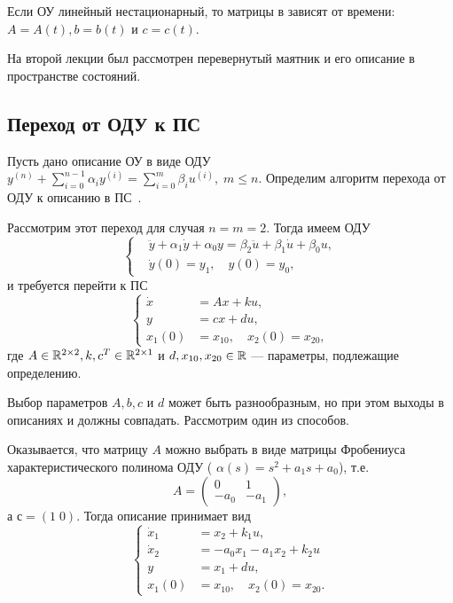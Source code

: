 \documentclass[../../TAU.tex]{subfiles}
\begin{document}
    Если ОУ линейный нестационарный, то матрицы в  зависят от времени: $A=A(t), b=b(t)$ и $c=c(t)$.

    На второй лекции был рассмотрен перевернутый маятник и его описание в пространстве состояний.

\subsection{Переход от ОДУ к ПС}

    Пусть дано описание ОУ в виде ОДУ  
    $y^{(n)}+\sum_{i=0}^{n-1}\alpha_iy^{(i)}=\sum_{i=0}^{m}\beta_iu^{(i)},\; m \le n$. 
    Определим алгоритм перехода от ОДУ к описанию в ПС~.

    Рассмотрим этот переход для случая $n=m=2$. Тогда имеем ОДУ
    \begin{equation}\label{ODU_2}
        \left\{
        \begin{aligned}
            &\ddot y + \alpha_1 \dot y + \alpha_0 y = \beta_2 \ddot{u} + \beta_1 \dot u + \beta_0 u,\\
            &\dot y(0) = y_1,\quad y(0) = y_0,
        \end{aligned}\right.
    \end{equation}
        и требуется перейти к ПС
    \begin{equation}\label{STDS_2}
        \left\{
        \begin{aligned}
            \dot x &= Ax + ku,\\
            y &= cx + du,\\
            x_1(0) &= x_{10},\quad x_2(0) = x_{20},
        \end{aligned}
        \right.
    \end{equation}
    где 
    $A\in\mathbb{R}^{2\times2}, k, c^T\in\mathbb{R}^{2\times1}$ 
    и 
    $d,x_{10}, x_{20}\in\mathbb{R}$ --- 
    параметры, подлежащие определению.

    Выбор параметров $A,b,c$ и $d$ может быть разнообразным, но при этом выходы в описаниях  и  должны совпадать. Рассмотрим один из способов.

    Оказывается, что матрицу $A$ можно выбрать в виде матрицы Фробениуса характеристического полинома ОДУ  (
    $\alpha(s) = s^2+a_1s+a_0$), 
    т.е.
    $$
        A =
        \begin{pmatrix}
            0&    1\\
            -a_0& -a_1
        \end{pmatrix},
    $$
    а $с = (1\; 0)$. Тогда описание  принимает вид
    \begin{equation}\label{EQ1}
        \left\{
        \begin{aligned}
            \dot x_1 &= x_2 + k_1 u,\\
            \dot x_2 &= -a_0x_1-a_1x_2+k_2u\\
            y &= x_1 + du,\\
            x_1(0) &= x_{10},\quad x_2(0) = x_{20}.
        \end{aligned}
        \right.
    \end{equation}
\end{document}

